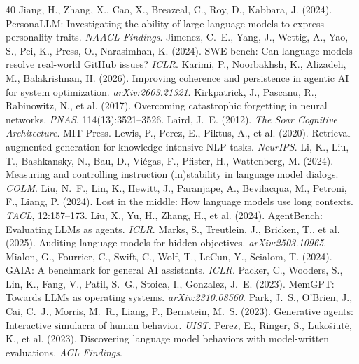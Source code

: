 \documentclass[11pt]{article}
\begin{document}
\begin{thebibliography}{40}
 Jiang, H., Zhang, X., Cao, X., Breazeal, C., Roy, D., Kabbara, J. (2024). PersonaLLM: Investigating the ability of large language models to express personality traits. \emph{NAACL Findings}.
 Jimenez, C.~E., Yang, J., Wettig, A., Yao, S., Pei, K., Press, O., Narasimhan, K. (2024). SWE-bench: Can language models resolve real-world GitHub issues? \emph{ICLR}.
 Karimi, P., Noorbakhsh, K., Alizadeh, M., Balakrishnan, H. (2026). Improving coherence and persistence in agentic AI for system optimization. \emph{arXiv:2603.21321}.
 Kirkpatrick, J., Pascanu, R., Rabinowitz, N., et al. (2017). Overcoming catastrophic forgetting in neural networks. \emph{PNAS}, 114(13):3521--3526.
 Laird, J.~E. (2012). \emph{The Soar Cognitive Architecture}. MIT Press.
 Lewis, P., Perez, E., Piktus, A., et al. (2020). Retrieval-augmented generation for knowledge-intensive NLP tasks. \emph{NeurIPS}.
 Li, K., Liu, T., Bashkansky, N., Bau, D., Vi\'egas, F., Pfister, H., Wattenberg, M. (2024). Measuring and controlling instruction (in)stability in language model dialogs. \emph{COLM}.
 Liu, N.~F., Lin, K., Hewitt, J., Paranjape, A., Bevilacqua, M., Petroni, F., Liang, P. (2024). Lost in the middle: How language models use long contexts. \emph{TACL}, 12:157--173.
 Liu, X., Yu, H., Zhang, H., et al. (2024). AgentBench: Evaluating LLMs as agents. \emph{ICLR}.
 Marks, S., Treutlein, J., Bricken, T., et al. (2025). Auditing language models for hidden objectives. \emph{arXiv:2503.10965}.
 Mialon, G., Fourrier, C., Swift, C., Wolf, T., LeCun, Y., Scialom, T. (2024). GAIA: A benchmark for general AI assistants. \emph{ICLR}.
 Packer, C., Wooders, S., Lin, K., Fang, V., Patil, S.~G., Stoica, I., Gonzalez, J.~E. (2023). MemGPT: Towards LLMs as operating systems. \emph{arXiv:2310.08560}.
 Park, J.~S., O'Brien, J., Cai, C.~J., Morris, M.~R., Liang, P., Bernstein, M.~S. (2023). Generative agents: Interactive simulacra of human behavior. \emph{UIST}.
 Perez, E., Ringer, S., Luko\v{s}i\=ut\.e, K., et al. (2023). Discovering language model behaviors with model-written evaluations. \emph{ACL Findings}.

\end{thebibliography}
\end{document}
